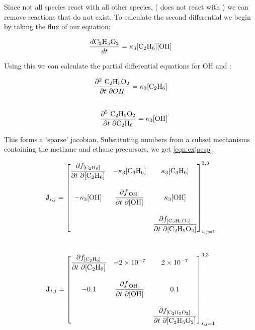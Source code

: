 Since not all species react with all other species, ( does not react with ) we can remove reactions that do not exist. To calculate the second differential we begin by taking the flux of our equation: 

\begin{equation}
    \frac{d\ce{C2H5O2}}{dt} = \kappa_3 [\ce{C2H6}][\ce{OH}]
\end{equation}

Using this we can calculate the partial differential equations for OH and :

\begin{eqnarray}
    \frac{\partial ^2 \ \ce{C2H5O2} }{\partial t \ \partial OH} = \kappa_3 [\ce{C2H6}] \\[20pt]
    \frac{\partial ^2 \ \ce{C2H5O2} }{\partial t \ \partial \ce{C2H6}} = \kappa_3 [\ce{OH}]
\end{eqnarray}


This forms a `sparse' jacobian. Substituting numbers from a subset mechanisms containing the methane and ethane precursors, we get \autoref{eqn:exjacsp}.





\begin{eqnarray}
 \mathbf{J}_{i,j} =
\begin{bmatrix}
\dfrac{\partial f_{[\ce{C2H6}]}}{\partial t \ \partial {[\ce{C2H6}]}} &
  - \kappa_3[\ce{C3H6}] &
  \kappa_3[\ce{C3H6}] \\[20pt]
-\kappa_3[\ce{OH}] &
  \dfrac{\partial f_{[\ce{OH}]}}{\partial t \ \partial {[\ce{OH}]}} &
\kappa_3[\ce{OH}] \\[20pt]
\  &
 \  &
  \dfrac{\partial f_{[\ce{C2H5O2}]}}{\partial t \ \partial {[\ce{C2H5O2}]}}
\end{bmatrix}_{i,j=1}^{3,3}
\label{eqn:exjacsppre}
\end{eqnarray}\\



   \begin{eqnarray}
    \mathbf{J}_{i,j} =
 \begin{bmatrix}
   \dfrac{\partial f_{[\ce{C2H6}]}}{\partial t \ \partial {[\ce{C2H6}]}} &
     - 2\times 10^{-7} &
     2\times 10^{-7} \\[20pt]
   -0.1 &
     \dfrac{\partial f_{[\ce{OH}]}}{\partial t \ \partial {[\ce{OH}]}} &
  0.1 \\[20pt]
   \  &
    \  &
     \dfrac{\partial f_{[\ce{C2H5O2}]}}{\partial t \ \partial {[\ce{C2H5O2}]}}
 \end{bmatrix}_{i,j=1}^{3,3}
 \label{eqn:exjacsp}
\end{eqnarray}\\

